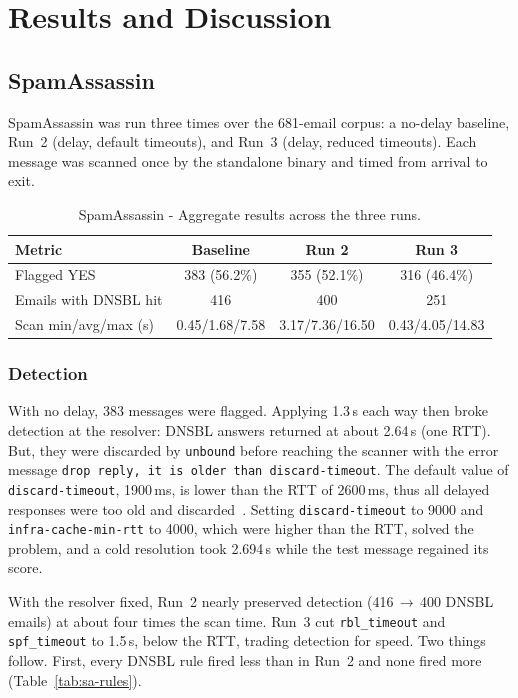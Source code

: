 \chapter{Results and Discussion}

\section{SpamAssassin}

SpamAssassin was run three times over the 681-email corpus: a no-delay
baseline, Run~2 (delay, default timeouts), and Run~3 (delay, reduced timeouts).
Each message was scanned once by the standalone binary and timed from arrival to
exit.

\begin{table}[h]\centering
\small
\begin{tabular}{@{}lccc@{}}
\toprule
Metric & Baseline & Run 2 & Run 3 \\
\midrule
Flagged YES           & 383 (56.2\%) & 355 (52.1\%) & 316 (46.4\%) \\
Emails with DNSBL hit  & 416 & 400 & 251 \\
Scan min/avg/max (s)   & 0.45/1.68/7.58 & 3.17/7.36/16.50 & 0.43/4.05/14.83 \\
\bottomrule
\end{tabular}
\caption{SpamAssassin - Aggregate results across the three runs.}
\label{tab:sa-agg}
\end{table}

\subsection{Detection}
\label{sec:spamassassin_detection}

With no delay, 383 messages were flagged. Applying 1.3\,s each way then broke
detection at the resolver: DNSBL answers returned at about 2.64\,s (one RTT). But,
they were discarded by \texttt{unbound} before reaching the scanner with the error message \texttt{drop reply, it is older than discard-timeout}. The default value of \texttt{discard-timeout}, 1900\,ms, is lower than the RTT of 2600\,ms, thus all delayed responses were too old and discarded~\cite{archwiki_unbound}. Setting \texttt{discard-timeout} to 9000 and \texttt{infra-cache-min-rtt}
to 4000, which were higher than the RTT, solved the problem, and a cold
resolution took 2.694\,s while the test message regained its score.

With the resolver fixed, Run~2 nearly preserved detection (416\,$\to$\,400 DNSBL
emails) at about four times the scan time. Run~3 cut \texttt{rbl\_timeout} and
\texttt{spf\_timeout} to 1.5\,s, below the RTT, trading detection for speed. Two
things follow. First, every DNSBL rule fired less than in Run~2 and none fired
more (Table~\ref{tab:sa-rules}).

